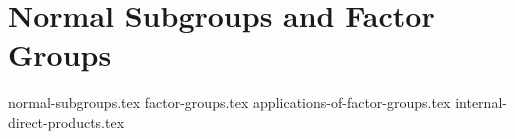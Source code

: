 \chapter{Normal Subgroups and Factor Groups}
{normal-subgroups.tex}
{factor-groups.tex}
{applications-of-factor-groups.tex}
{internal-direct-products.tex}
